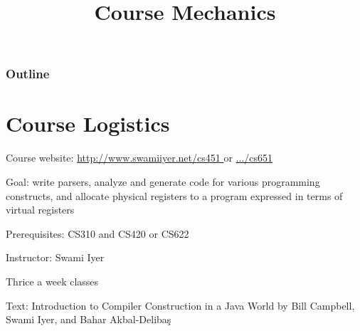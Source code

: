 \documentclass[8pt,a4paper,compress]{beamer}
\title{Course Mechanics}
\date{}
\begin{document}
\begin{frame}
\vfill
\titlepage
\end{frame}

\begin{frame}
\frametitle{Outline}
\tableofcontents
\end{frame}

\section{Course Logistics}
\begin{frame}[fragile]
\pause

Course website: \href{http://www.swamiiyer.net/cs451}{http://www.swamiiyer.net/cs451 \ExternalLink} or \href{http://www.swamiiyer.net/cs651}{.../cs651 \ExternalLink}

\pause
\bigskip

Goal: write parsers, analyze and generate code for various programming constructs, and allocate physical registers to a program expressed in terms of virtual registers

\pause
\bigskip

Prerequisites: CS310 and CS420 or CS622

\pause
\bigskip

Instructor: Swami Iyer

\pause
\bigskip

Thrice a week classes

\pause
\bigskip

Text: Introduction to Compiler Construction in a Java World 
by Bill Campbell, Swami Iyer, and Bahar Akbal-Deliba\c{s}
\end{frame}
\end{document}
